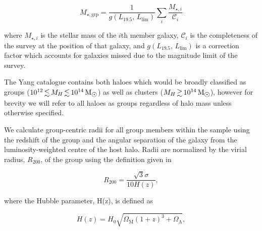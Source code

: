 \documentclass[a4paper,fleqn,usenatbib]{mnras}
\newcommand{\Msun}{\,\mathrm{M_{\sun}}}
\begin{document}
\begin{equation}
  M_{\star,\text{grp}} = \frac{1}{g(L_{19.5},\,L_{\text{lim}})} \sum_i
  \frac{M_{\star,i}}{\mathcal{C}_i}
\end{equation}

\noindent
where $M_{\star,i}$ is the stellar mass of the $i$th member galaxy,
$\mathcal{C}_i$ is the completeness of the survey at the position of
that galaxy, and $g(L_{19.5},\,L_{\text{lim}})$ is a correction factor
which accounts for galaxies missed due to the magnitude limit of the
survey.
\par
The Yang catalogue contains both haloes which would be broadly classified as
groups ($10^{12} \la M_H \la 10^{14}\Msun$) as well as clusters ($M_H
\ga 10^{14}\Msun$), however for brevity we will refer to all haloes as
groups regardless of halo mass unless otherwise specified.
\par
We calculate group-centric radii for all group members within the
sample using the redshift of the group and the angular separation of the galaxy from the
luminosity-weighted centre of the host halo.  Radii are
normalized by the virial radius, $R_{200}$, of the group using the
definition given in \citet{carlberg1997}

\begin{equation}
  R_{200} = \frac{\sqrt{3} \sigma}{10 H(z)},
\end{equation}

\noindent
where the Hubble parameter, H(z), is defined as

\begin{equation}
  H(z) = H_0 \sqrt{\Omega_\mathrm{M} (1+z)^3 +
    \Omega_\mathrm{\Lambda}},
\end{equation}
\end{document}
